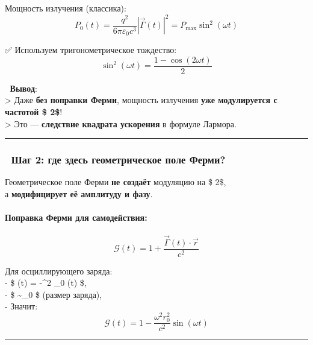 \documentclass[11pt]{article}
\begin{document}
Мощность излучения (классика):\\
\[
P_0(t) = \frac{q^2}{6\pi\varepsilon_0 c^3} |\vec{\Gamma}(t)|^2 = P_{\text{max}} \sin^2(\omega t)
\]

✅ Используем тригонометрическое тождество:\\
\[
\sin^2(\omega t) = \frac{1 - \cos(2\omega t)}{2}
\]

📌 \textbf{Вывод}:\\
\textgreater{} Даже \textbf{без поправки Ферми}, мощность излучения
\textbf{уже модулируется с частотой \$ 2\omega \$}!\\
\textgreater{} Это --- \textbf{следствие квадрата ускорения} в формуле
Лармора.

\begin{center}\rule{0.5\linewidth}{\linethickness}\end{center}

\subsubsection{🔹 Шаг 2: где здесь геометрическое поле
Ферми?}\label{ux448ux430ux433-2-ux433ux434ux435-ux437ux434ux435ux441ux44c-ux433ux435ux43eux43cux435ux442ux440ux438ux447ux435ux441ux43aux43eux435-ux43fux43eux43bux435-ux444ux435ux440ux43cux438}

Геометрическое поле Ферми \textbf{не создаёт} модуляцию на \$
2\omega \$,\\
а \textbf{модифицирует её амплитуду и фазу}.

\paragraph{Поправка Ферми для
самодействия:}\label{ux43fux43eux43fux440ux430ux432ux43aux430-ux444ux435ux440ux43cux438-ux434ux43bux44f-ux441ux430ux43cux43eux434ux435ux439ux441ux442ux432ux438ux44f}

\[
\mathcal{G}(t) = 1 + \frac{\vec{\Gamma}(t) \cdot \vec{r}}{c^2}
\]

Для осциллирующего заряда:\\
- \$ \vec{\Gamma}(t) = -\omega\^{}2 \_0 \sin(\omega t) \$,\\
- \$  \sim {}\_0 \$ (размер заряда),\\
- Значит:\\
\[
\mathcal{G}(t) = 1 - \frac{\omega^2 r_0^2}{c^2} \sin(\omega t)
\]

\begin{center}\rule{0.5\linewidth}{\linethickness}\end{center}
\end{document}
